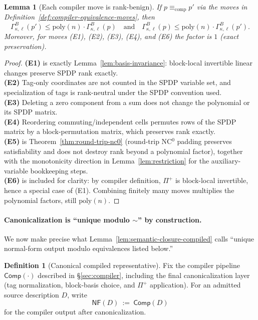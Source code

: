 \documentclass[12pt]{article}
\newtheorem{lemma}[theorem]{Lemma}
\theoremstyle{definition}
\newtheorem{definition}{Definition}
\theoremstyle{definition}
\theoremstyle{remark}
\theoremstyle{remark}
\begin{document}
\begin{lemma}[Each compiler move is rank-benign]
\label{lem:each-move-rank-benign}
If $p \equiv_{\mathrm{comp}} p'$ via the moves in Definition~\ref{def:compiler-equivalence-moves}, then
\[
\Gamma^{B}_{\kappa,\ell}(p') \le \mathrm{poly}(n)\cdot \Gamma^{B}_{\kappa,\ell}(p)
\quad\text{and}\quad
\Gamma^{B}_{\kappa,\ell}(p) \le \mathrm{poly}(n)\cdot \Gamma^{B}_{\kappa,\ell}(p').
\]
Moreover, for moves (E1), (E2), (E3), (E4), and (E6) the factor is $1$ (exact preservation).
\end{lemma}

\begin{proof}
\textbf{(E1)} is exactly Lemma~\ref{lem:basis-invariance}: block-local invertible linear changes preserve SPDP
rank exactly. \\
\textbf{(E2)} Tag-only coordinates are not counted in the SPDP variable set, and specialization of
tags is rank-neutral under the SPDP convention used. \\
\textbf{(E3)} Deleting a zero component from a sum does not change the polynomial or its SPDP matrix. \\
\textbf{(E4)} Reordering commuting/independent cells permutes rows of the SPDP matrix by a
block-permutation matrix, which preserves rank exactly. \\
\textbf{(E5)} is Theorem~\ref{thm:round-trip-nc0} (round-trip NC$^0$ padding preserves satisfiability and does not
destroy rank beyond a polynomial factor), together with the monotonicity direction in
Lemma~\ref{lem:restriction} for the auxiliary-variable bookkeeping steps. \\
\textbf{(E6)} is included for clarity: by compiler definition, $\Pi^+$ is block-local invertible,
hence a special case of (E1).
Combining finitely many moves multiplies the polynomial factors, still $\mathrm{poly}(n)$.
\end{proof}

\paragraph{Canonicalization is ``unique modulo $\sim$'' by construction.}
We now make precise what Lemma~\ref{lem:semantic-closure-compiled} calls ``unique normal-form output modulo
equivalences listed below.''

\begin{definition}[Canonical compiled representative]
\label{def:canonical-compiled-rep}
Fix the compiler pipeline $\mathsf{Comp}(\cdot)$ described in \S\ref{sec:compiler}, including the final
canonicalization layer (tag normalization, block-basis choice, and $\Pi^+$ application).
For an admitted source description $D$, write
\[
\mathsf{NF}(D)\ :=\ \mathsf{Comp}(D)
\]
for the compiler output after canonicalization.
\end{definition}
\end{document}
